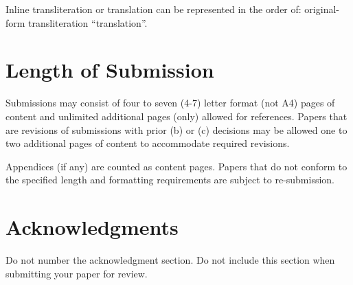 \documentclass[11pt,letterpaper]{article}
\begin{document}
Inline transliteration or translation can be represented in
the order of: original-form transliteration ``translation''.

\section{Length of Submission}
\label{sec:length}

Submissions may consist of four to seven (4-7) letter format (not A4) pages of content and unlimited additional pages (only) allowed for references. Papers that are revisions of submissions with prior (b) or (c) decisions may be allowed one to two additional pages of content to accommodate required revisions.

Appendices (if any) are counted as content pages. Papers that do not conform to the specified length and
formatting requirements are subject to re-submission.


\section*{Acknowledgments}

Do not number the acknowledgment section. Do not include this section when submitting your paper for review.


\end{document}
